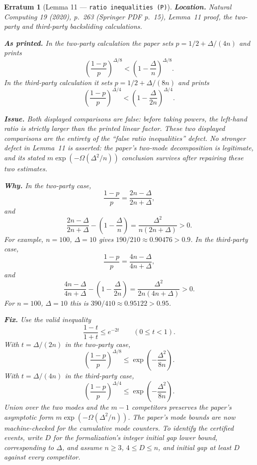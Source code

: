 \documentclass[11pt]{article}
\theoremstyle{erratumstyle}
\newtheorem{erratum}{Erratum}
\begin{document}
\begin{erratum}[Lemma 11 --- \texttt{ratio inequalities (P)}]
\textbf{Location.} \emph{Natural Computing} 19 (2020), p.~263
(Springer PDF p.~15), Lemma~11 proof, the two-party and third-party
backsliding calculations.

\medskip
\textbf{As printed.} In the two-party calculation the paper sets
$p=1/2+\Delta/(4n)$ and prints
\[
 \left(\frac{1-p}{p}\right)^{\Delta/8}
 < \left(1-\frac{\Delta}{n}\right)^{\Delta/8}.
\]
In the third-party calculation it sets
$p=1/2+\Delta/(8n)$ and prints
\[
 \left(\frac{1-p}{p}\right)^{\Delta/4}
 < \left(1-\frac{\Delta}{2n}\right)^{\Delta/4}.
\]

\medskip
\textbf{Issue.} Both displayed comparisons are false: before taking powers,
the left-hand ratio is strictly \emph{larger} than the printed linear factor.
These two displayed comparisons are the entirety of the ``false ratio
inequalities'' defect. No stronger defect in Lemma~11 is asserted: the
paper's two-mode decomposition is legitimate, and its stated
$m\exp(-\Omega(\Delta^2/n))$ conclusion survives after repairing these two
estimates.

\medskip
\textbf{Why.} In the two-party case,
\[
 \frac{1-p}{p}=\frac{2n-\Delta}{2n+\Delta},
\]
and
\[
 \frac{2n-\Delta}{2n+\Delta}
 -\left(1-\frac{\Delta}{n}\right)
 =\frac{\Delta^2}{n(2n+\Delta)}>0.
\]
For example, $n=100$, $\Delta=10$ gives
$190/210\approx0.90476>0.9$. In the third-party case,
\[
 \frac{1-p}{p}=\frac{4n-\Delta}{4n+\Delta},
\]
and
\[
 \frac{4n-\Delta}{4n+\Delta}
 -\left(1-\frac{\Delta}{2n}\right)
 =\frac{\Delta^2}{2n(4n+\Delta)}>0.
\]
For $n=100$, $\Delta=10$ this is
$390/410\approx0.95122>0.95$.

\medskip
\textbf{Fix.} Use the valid inequality
\[
  \frac{1-t}{1+t}\le e^{-2t}
  \qquad (0\le t<1).
\]
With $t=\Delta/(2n)$ in the two-party case,
\[
 \left(\frac{1-p}{p}\right)^{\Delta/8}
 \le \exp\!\left(-\frac{\Delta^2}{8n}\right).
\]
With $t=\Delta/(4n)$ in the third-party case,
\[
 \left(\frac{1-p}{p}\right)^{\Delta/4}
 \le \exp\!\left(-\frac{\Delta^2}{8n}\right).
\]
Union over the two modes and the $m-1$ competitors preserves the paper's
asymptotic form $m\exp(-\Omega(\Delta^2/n))$. The paper's mode bounds are
now machine-checked for the cumulative mode counters. To identify the
certified events, write $D$ for the formalization's integer initial gap
lower bound, corresponding to $\Delta$, and assume $n\ge3$,
$4\le D\le n$, and initial gap at least $D$ against every competitor.


\end{erratum}
\end{document}
